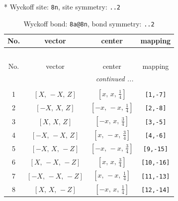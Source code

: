\documentclass[fleqn,8pt]{jsarticle}
\begin{document}
* Wyckoff site: {\tt 8n}, site symmetry: {\tt ..2}
\renewcommand{\arraystretch}{1.2}
\begin{longtable}{cccc}
\caption{Wyckoff bond: {\tt 8a@8n}, bond symmetry: {\tt ..2}}
 \\
 \hline \hline
No. & vector & center & mapping \\ \hline \endfirsthead

\multicolumn{3}{l}{\tablename\ \thetable{}} \\
 \hline \hline
No. & vector & center & mapping \\ \hline \endhead

 \hline \hline
\multicolumn{3}{r}{\footnotesize\it continued ...} \\ \endfoot

 \hline \hline
\multicolumn{3}{r}{} \\ \endlastfoot

1 & $\left[ X,\, - X,\, Z \right]$ & $\left[ x,\, x,\, \frac{1}{4} \right]$ & {\tt [1,-7]} \\ \hline
2 & $\left[ - X,\, X,\, Z \right]$ & $\left[ - x,\, - x,\, \frac{1}{4} \right]$ & {\tt [2,-8]} \\ \hline
3 & $\left[ X,\, X,\, Z \right]$ & $\left[ - x,\, x,\, \frac{3}{4} \right]$ & {\tt [3,-5]} \\ \hline
4 & $\left[ - X,\, - X,\, Z \right]$ & $\left[ x,\, - x,\, \frac{3}{4} \right]$ & {\tt [4,-6]} \\ \hline
5 & $\left[ - X,\, X,\, - Z \right]$ & $\left[ - x,\, - x,\, \frac{3}{4} \right]$ & {\tt [9,-15]} \\ \hline
6 & $\left[ X,\, - X,\, - Z \right]$ & $\left[ x,\, x,\, \frac{3}{4} \right]$ & {\tt [10,-16]} \\ \hline
7 & $\left[ - X,\, - X,\, - Z \right]$ & $\left[ x,\, - x,\, \frac{1}{4} \right]$ & {\tt [11,-13]} \\ \hline
8 & $\left[ X,\, X,\, - Z \right]$ & $\left[ - x,\, x,\, \frac{1}{4} \right]$ & {\tt [12,-14]} \\
\end{longtable}
\renewcommand{\arraystretch}{1.2}
\end{document}
